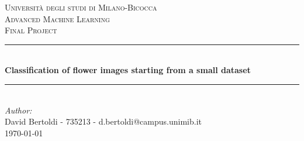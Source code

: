 \begin{titlepage}

\newcommand{\HRule}{\rule{\linewidth}{0.5mm}} %

\center %
 

\textsc{\LARGE Università degli studi di Milano-Bicocca}\\[1cm] %
\textsc{\Large Advanced Machine Learning }\\[0.3cm] %
\textsc{\large Final Project}\\[0.1cm] %


\HRule \\[0.4cm]
{ \huge \bfseries Classification of flower images starting from a small dataset}\\[0.4cm] %
\HRule \\[1.5cm]
 

\large
\emph{Author:}\\
David Bertoldi - 735213 - d.bertoldi@campus.unimib.it \\[1cm]  %




{\large \today}\\[2cm] %


\end{titlepage}
